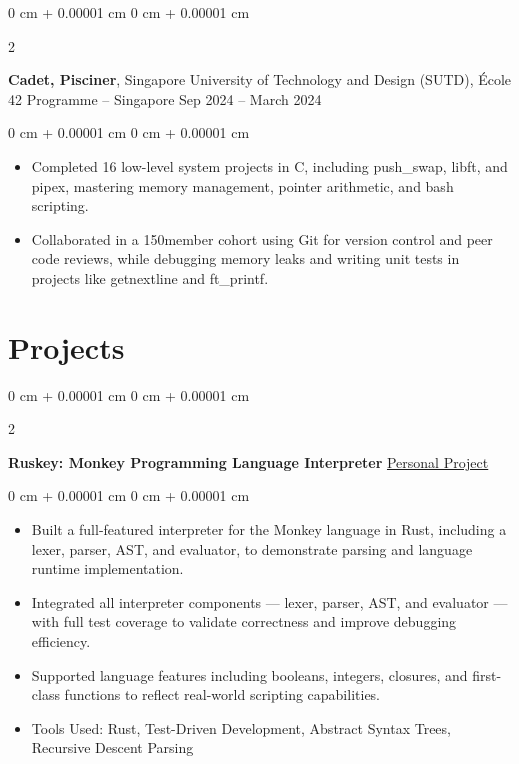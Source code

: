 \documentclass[10pt, letterpaper]{article}
\newenvironment{highlights}{
    \begin{itemize}[
        topsep=0.10 cm,
        parsep=0.10 cm,
        partopsep=0pt,
        itemsep=0pt,
        leftmargin=0 cm + 10pt
    ]
}{
    \end{itemize}
} %
\newenvironment{onecolentry}{
    \begin{adjustwidth}{
        0 cm + 0.00001 cm
    }{
        0 cm + 0.00001 cm
    }
}{
    \end{adjustwidth}
} %
\newenvironment{twocolentry}[2][]{
    \onecolentry
    \def\secondColumn{#2}
    \setcolumnwidth{\fill, 4.5 cm}
    \begin{paracol}{2}
}{
    \switchcolumn \raggedleft \secondColumn
    \end{paracol}
    \endonecolentry
} %
\begin{document}
                \vspace{0.2 cm}
                
                \vspace{0.2 cm}
                
                \begin{twocolentry}{
                    Sep 2024 – March 2024
                }
                    \textbf{Cadet, Pisciner}, Singapore University of Technology and Design (SUTD), École 42 Programme -- Singapore\end{twocolentry}
                \vspace{0.10 cm}
                \begin{onecolentry}
                    \begin{highlights}
                        \item Completed 16 low-level system projects in C, including push\_swap, libft, and pipex, mastering memory management, pointer arithmetic, and bash scripting.
                        \item Collaborated in a 150\-member cohort using Git for version control and peer code reviews, while debugging memory leaks and writing unit tests in projects like getnextline and ft\_printf.
                    \end{highlights}
                \end{onecolentry}
        
                \vspace{0.2 cm}
    
        \section{Projects}
        
        \begin{twocolentry}{
            \href{https://github.com/yuann3/Ruskey/}{Personal Project}
        }
            \textbf{Ruskey: Monkey Programming Language Interpreter}\end{twocolentry}

        \vspace{0.10 cm}
        \begin{onecolentry}
            \begin{highlights}
                \item Built a full-featured interpreter for the Monkey language in Rust, including a lexer, parser, AST, and evaluator, to demonstrate parsing and language runtime implementation.
                \item Integrated all interpreter components — lexer, parser, AST, and evaluator — with full test coverage to validate correctness and improve debugging efficiency.        
                \item Supported language features including booleans, integers, closures, and first-class functions to reflect real-world scripting capabilities.
                \item Tools Used: Rust, Test-Driven Development, Abstract Syntax Trees, Recursive Descent Parsing
            \end{highlights}
        \end{onecolentry}
\end{document}
